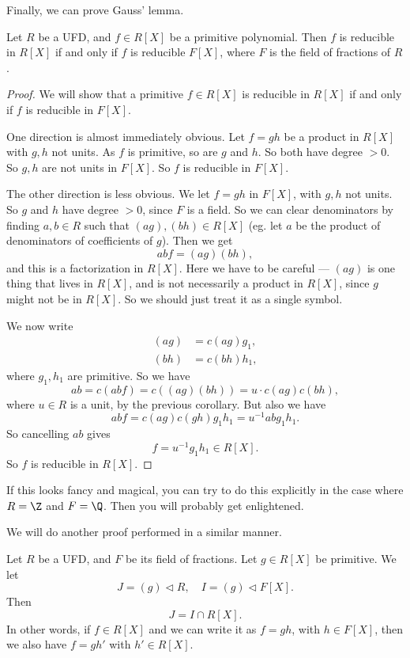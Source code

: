\documentclass[a4paper]{article}
\begin{document}
Finally, we can prove Gauss' lemma.
\begin{lemma}
  Let $R$ be a UFD, and $f \in R[X]$ be a primitive polynomial. Then $f$ is reducible in $R[X]$ if and only if $f$ is reducible $F[X]$, where $F$ is the field of fractions of $R$.
\end{lemma}

\begin{proof}
  We will show that a primitive $f \in R[X]$ is reducible in $R[X]$ if and only if $f$ is reducible in $F[X]$.

  One direction is almost immediately obvious. Let $f = gh$ be a product in $R[X]$ with $g, h$ not units. As $f$ is primitive, so are $g$ and $h$. So both have degree $> 0$. So $g, h$ are not units in $F[X]$. So $f$ is reducible in $F[X]$.

  The other direction is less obvious. We let $f = gh$ in $F[X]$, with $g, h$ not units. So $g$ and $h$ have degree $> 0$, since $F$ is a field. So we can clear denominators by finding $a, b \in R$ such that $(ag), (bh) \in R[X]$ (eg. let $a$ be the product of denominators of coefficients of $g$). Then we get
  \[
    ab f = (ag)(bh),
  \]
  and this is a factorization in $R[X]$. Here we have to be careful --- $(ag)$ is one thing that lives in $R[X]$, and is not necessarily a product in $R[X]$, since $g$ might not be in $R[X]$. So we should just treat it as a single symbol.

  We now write
  \begin{align*}
    (ag) &= c(ag) g_1,\\
    (bh) &= c(bh) h_1,
  \end{align*}
  where $g_1, h_1$ are primitive. So we have
  \[
    ab = c(abf) = c((ag)(bh)) = u \cdot c(ag)c(bh),
  \]
  where $u \in R$ is a unit, by the previous corollary. But also we have
  \[
    abf = c(ag)c(gh) g_1 h_1 = u^{-1}ab g_1 h_1.
  \]
  So cancelling $ab$ gives
  \[
    f = u^{-1} g_1 h_1 \in R[X].
  \]
  So $f$ is reducible in $R[X]$.
\end{proof}
If this looks fancy and magical, you can try to do this explicitly in the case where $R = \Z$ and $F = \Q$. Then you will probably get enlightened.

We will do another proof performed in a similar manner.
\begin{prop}
  Let $R$ be a UFD, and $F$ be its field of fractions. Let $g \in R[X]$ be primitive. We let
  \[
    J = (g) \lhd R,\quad I = (g) \lhd F[X].
  \]
  Then
  \[
    J = I \cap R[X].
  \]
  In other words, if $f \in R[X]$ and we can write it as $f = gh$, with $h \in F[X]$, then we also have $f = gh'$ with $h' \in R[X]$.
\end{prop}
\end{document}
